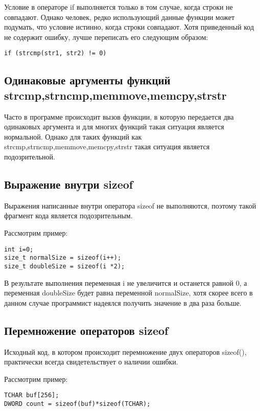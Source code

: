 Условие в операторе if выполняется только в том случае, когда строки не совпадают. Однако человек,
редко использующий данные функции может подумать, что условие истинно, когда строки совпадают.
Хотя приведенный код не содержит ошибку, лучше переписать его следующим образом:
\begin{lstlisting}
if (strcmp(str1, str2) != 0)
\end{lstlisting}

\subsection{Одинаковые аргументы функций strcmp,strncmp,memmove,memcpy,strstr}
\label{sec:eqArgs}
Часто в программе происходит вызов функции, в которую передается два одинаковых аргумента и для
многих функций такая ситуация является нормальной. Однако для таких функций как strcmp,strncmp,memmove,memcpy,strstr
такая ситуация является подозрительной.

\subsection{Выражение внутри sizeof}
\label{sec:sizeof}
Выражения написанные внутри оператора sizeof не выполняются, поэтому такой фрагмент кода является подозрительным.

Рассмотрим пример:
\begin{lstlisting}
int i=0;
size_t normalSize = sizeof(i++);
size_t doubleSize = sizeof(i *2);
\end{lstlisting}

В результате выполнения переменная i не увеличится и останется равной 0, а переменная doubleSize
будет равна переменной normalSize, хотя скорее всего в данном случае программист надеялся получить
значение в два раза больше. 

\subsection{Перемножение операторов sizeof}
\label{sec:sizeofMul}
Исходный код, в котором происходит перемножение двух операторов sizeof(), практически всегда
свидетельствует о наличии ошибки.

Рассмотрим пример:
\begin{lstlisting}
TCHAR buf[256];
DWORD count = sizeof(buf)*sizeof(TCHAR);
\end{lstlisting}

